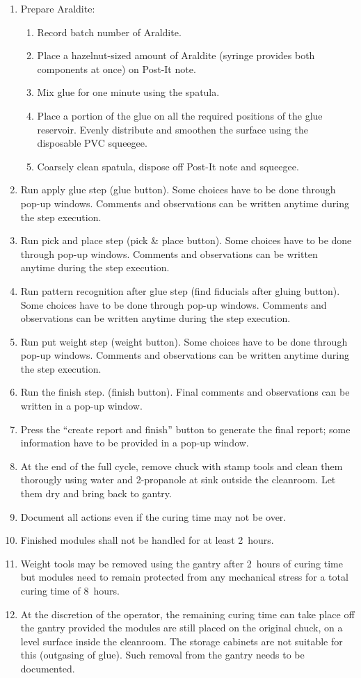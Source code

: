 \documentclass[12pt]{unlsilabsop}
\begin{document}
\begin{enumerate}
    \item Prepare Araldite:
      \begin{enumerate}
        \item Record batch number of Araldite.
	\item Place a hazelnut-sized amount of Araldite (syringe provides both components at once) on Post-It note.
	\item Mix glue for one minute using the spatula.
	\item Place a portion of the glue on all the required positions of the glue reservoir. Evenly distribute and smoothen the surface using the disposable PVC squeegee.
	\item Coarsely clean spatula, dispose off Post-It note and squeegee.
    \end{enumerate}
    \item Run apply glue step (glue button). Some choices have to be done through pop-up windows. Comments and observations can be written anytime during the step execution.
    \item Run pick and place step (pick \& place button). Some choices have to be done through pop-up windows. Comments and observations can be written anytime during the step execution.
    \item Run pattern recognition after glue step (find fiducials after gluing button). Some choices have to be done through pop-up windows. Comments and observations can be written anytime during the step execution.
    \item Run put weight step (weight button). Some choices have to be done through pop-up windows. Comments and observations can be written anytime during the step execution.
    \item Run the finish step. (finish button). Final comments and observations can be written in a pop-up window.
    \item Press the ``create report and finish'' button to generate the final report; some information have to be provided in a pop-up window.
    \item At the end of the full cycle, remove chuck with stamp tools and clean them thorougly using water and 2-propanole at sink outside the cleanroom. Let them dry and bring back to gantry.
    \item Document all actions even if the curing time may not be over.
    \item Finished modules shall not be handled for at least 2~hours.
    \item Weight tools may be removed using the gantry after 2~hours of curing time but modules need to remain protected from any mechanical stress for a total curing time of 8~hours.
    \item At the discretion of the operator, the remaining curing time can take place off the gantry provided the modules are still placed on the original chuck, on a level surface inside the cleanroom. The storage cabinets are not suitable for this (outgasing of glue). Such removal from the gantry needs to be documented.
\end{enumerate}
\end{document}
